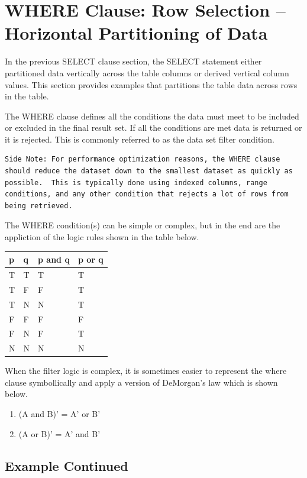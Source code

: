 \documentclass[]{book}
\providecommand{\tightlist}{%
  \setlength{\itemsep}{0pt}\setlength{\parskip}{0pt}}
\theoremstyle{definition}
\theoremstyle{definition}
\theoremstyle{definition}
\theoremstyle{remark}
\begin{document}
\hypertarget{where-clause-row-selection-horizontal-partitioning-of-data}{%
\section{WHERE Clause: Row Selection -- Horizontal Partitioning of
Data}\label{where-clause-row-selection-horizontal-partitioning-of-data}}

In the previous SELECT clause section, the SELECT statement either
partitioned data vertically across the table columns or derived vertical
column values. This section provides examples that partitions the table
data across rows in the table.

The WHERE clause defines all the conditions the data must meet to be
included or excluded in the final result set. If all the conditions are
met data is returned or it is rejected. This is commonly referred to as
the data set filter condition.

\begin{verbatim}
Side Note: For performance optimization reasons, the WHERE clause should reduce the dataset down to the smallest dataset as quickly as possible.  This is typically done using indexed columns, range conditions, and any other condition that rejects a lot of rows from being retrieved.
\end{verbatim}

The WHERE condition(s) can be simple or complex, but in the end are the
appliction of the logic rules shown in the table below.

\begin{longtable}[]{@{}llll@{}}
\toprule
p & q & p and q & p or q\tabularnewline
\midrule
\endhead
T & T & T & T\tabularnewline
T & F & F & T\tabularnewline
T & N & N & T\tabularnewline
F & F & F & F\tabularnewline
F & N & F & T\tabularnewline
N & N & N & N\tabularnewline
\bottomrule
\end{longtable}

When the filter logic is complex, it is sometimes easier to represent
the where clause symbollically and apply a version of DeMorgan's law
which is shown below.

\begin{enumerate}
\def\labelenumi{\arabic{enumi}.}
\tightlist
\item
  (A and B)' = A' or B'
\item
  (A or B)' = A' and B'
\end{enumerate}

\hypertarget{example-continued}{%
\subsection{Example Continued}\label{example-continued}}
\end{document}
